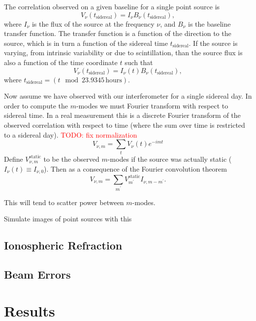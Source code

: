 \documentclass[twocolumn]{aastex6}
\newcommand{\todo}[1]{\textcolor{red}{TODO: #1}\PackageWarning{TODO:}{#1!}}
\begin{document}
The correlation observed on a given baseline for a single point source is
\begin{equation}
    V_\nu(t_{\textrm{sidereal}}) = I_\nu B_\nu(t_{\textrm{sidereal}}),
\end{equation}
where $I_\nu$ is the flux of the source at the frequency $\nu$, and $B_\nu$
is the baseline transfer function. The transfer function is a function of
the direction to the source, which is in turn a function of the sidereal
time $t_{\textrm{sidereal}}$. If the source is varying, from intrinsic
variability or due to scintillation, than the source flux is also a function
of the time coordinate $t$ such that
\begin{equation}
    V_\nu(t_{\textrm{sidereal}}) = I_\nu(t) B_\nu(t_{\textrm{sidereal}}),
\end{equation}
where $t_{\textrm{sidereal}} = (t \mod 23.9345\,\textrm{hours})$.

Now assume we have observed with our interferometer for a single sidereal day.
In order to compute the $m$-modes we must Fourier transform with respect to
sidereal time. In a real measurement this is a discrete Fourier transform of
the observed correlation with respect to time (where the sum over time is
restricted to a sidereal day). \todo{fix normalization}
\begin{equation}
    V_{\nu, m} = \sum_{t} V_\nu(t) e^{-imt}
\end{equation}
Define $V_{\nu, m}^{\textrm{static}}$ to be the observed $m$-modes if the source
was actually static ($I_\nu(t) \equiv I_{\nu,0}$). Then as a consequence of the
Fourier convolution theorem
\begin{equation}
    V_{\nu, m} = \sum_{m^\prime} V_{m^\prime}^\textrm{static} I_{\nu, m-m^\prime}.
\end{equation}

This will tend to scatter power between $m$-modes.

Simulate images of point sources with this


\subsection{Ionospheric Refraction}


\subsection{Beam Errors}


\section{Results}
\end{document}
